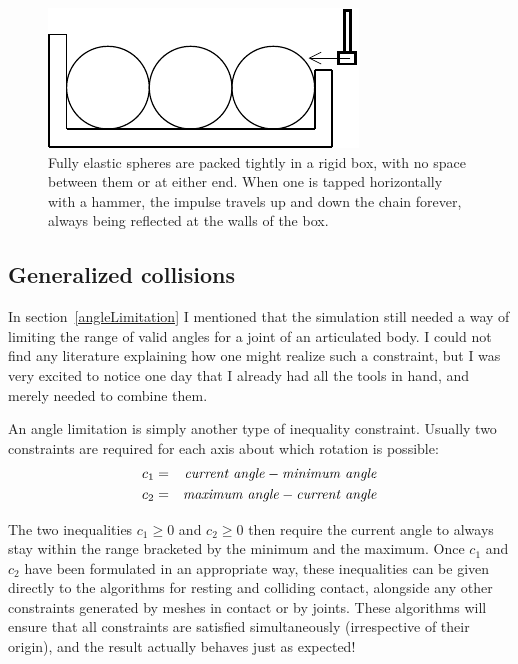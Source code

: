\begin{figure}
\centerline{\includegraphics{figures/contacts3}}
\caption{Fully elastic spheres are packed tightly in a rigid box, with no space between them or at
    either end. When one is tapped horizontally with a hammer, the impulse travels up and down the
    chain forever, always being reflected at the walls of the box.\label{contacts3Figure}}
\end{figure}


\subsection{Generalized collisions\label{generalizedCollisions}}

In section~\ref{angleLimitation} I mentioned that the simulation still needed a way of limiting
the range of valid angles for a joint of an articulated body. I could not find any literature
explaining how one might realize such a constraint, but I was very excited to notice one day that
I already had all the tools in hand, and merely needed to combine them.

An angle limitation is simply another type of inequality constraint. Usually two constraints are
required for each axis about which rotation is possible:
\begin{eqnarray}
c_1 & = & \mbox{\textit{current angle}} - \mbox{\textit{minimum angle}} \nonumber\\
c_2 & = & \mbox{\textit{maximum angle}} - \mbox{\textit{current angle}} \label{genCollIneq}
\end{eqnarray}

The two inequalities $c_1 \ge 0$ and $c_2 \ge 0$ then require the current angle to always stay
within the range bracketed by the minimum and the maximum. Once $c_1$ and $c_2$ have been
formulated in an appropriate way, these inequalities can be given directly to the algorithms
for resting and colliding contact, alongside any other constraints generated by meshes in contact
or by joints. These algorithms will ensure that all constraints are satisfied simultaneously
(irrespective of their origin), and the result actually behaves just as expected!

